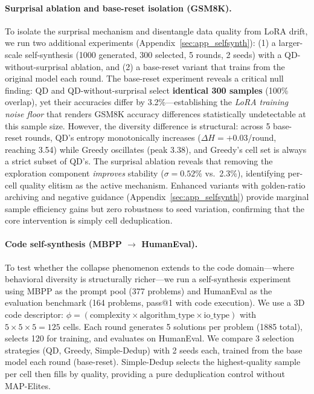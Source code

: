 \documentclass{article}
\begin{document}
\begin{enumerate}[nosep]
\paragraph{Surprisal ablation and base-reset isolation (GSM8K).}
To isolate the surprisal mechanism and disentangle data quality from LoRA drift, we run two additional experiments (Appendix~\ref{sec:app_selfsynth}): (1) a larger-scale self-synthesis (1000 generated, 300 selected, 5 rounds, 2 seeds) with a QD-without-surprisal ablation, and (2) a base-reset variant that trains from the original model each round.
The base-reset experiment reveals a critical null finding: QD and QD-without-surprisal select \textbf{identical 300 samples} (100\% overlap), yet their accuracies differ by 3.2\%---establishing the \emph{LoRA training noise floor} that renders GSM8K accuracy differences statistically undetectable at this sample size.
However, the diversity difference is structural: across 5 base-reset rounds, QD's entropy monotonically increases ($\Delta H{=}{+}0.03$/round, reaching 3.54) while Greedy oscillates (peak 3.38), and Greedy's cell set is always a strict subset of QD's.
The surprisal ablation reveals that removing the exploration component \emph{improves} stability ($\sigma{=}0.52\%$ vs.\ 2.3\%), identifying per-cell quality elitism as the active mechanism.
Enhanced variants with golden-ratio archiving and negative guidance (Appendix~\ref{sec:app_selfsynth}) provide marginal sample efficiency gains but zero robustness to seed variation, confirming that the core intervention is simply cell deduplication.

\paragraph{Code self-synthesis (MBPP $\to$ HumanEval).}
\label{sec:v7}
To test whether the collapse phenomenon extends to the code domain---where behavioral diversity is structurally richer---we run a self-synthesis experiment using MBPP as the prompt pool (377 problems) and HumanEval as the evaluation benchmark (164 problems, pass@1 with code execution).
We use a 3D code descriptor: $\phi = (\text{complexity} \times \text{algorithm\_type} \times \text{io\_type})$ with $5 \times 5 \times 5 = 125$ cells.
Each round generates 5 solutions per problem (1885 total), selects 120 for training, and evaluates on HumanEval.
We compare 3 selection strategies (QD, Greedy, Simple-Dedup) with 2 seeds each, trained from the base model each round (base-reset).
Simple-Dedup selects the highest-quality sample per cell then fills by quality, providing a pure deduplication control without MAP-Elites.


\end{enumerate}
\end{document}
